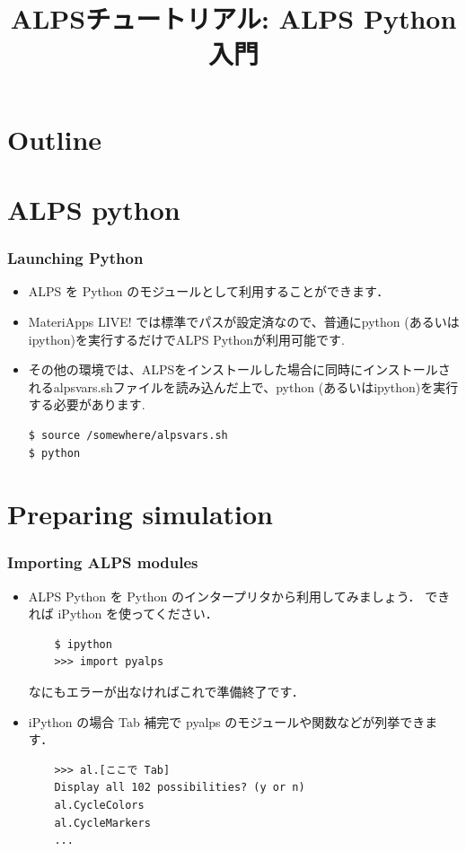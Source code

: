 
\title{ALPSチュートリアル: ALPS Python入門}



\begin{frame}
 \titlepage
\end{frame}

\section*{Outline}
\begin{frame}
 \tableofcontents
\end{frame}

\section{ALPS python}
\begin{frame}[t,fragile]
 \frametitle{Launching Python}
 \begin{itemize}
 \item \alert{ALPS を Python のモジュールとして利用することができます．}

 \item MateriApps LIVE! では標準でパスが設定済なので、普通にpython (あるいはipython)を実行するだけでALPS Pythonが利用可能です.

 \item その他の環境では、ALPSをインストールした場合に同時にインストールされるalpsvars.shファイルを読み込んだ上で、python (あるいはipython)を実行する必要があります.
\begin{lstlisting}
$ source /somewhere/alpsvars.sh
$ python
\end{lstlisting}
\end{itemize}
\end{frame}

\section{Preparing simulation}
\begin{frame}[t,fragile]
 \frametitle{Importing ALPS modules}

\begin{itemize}
 \item ALPS Python を Python のインタープリタから利用してみましょう．
       できれば iPython を使ってください．
       
       \begin{lstlisting}
	$ ipython
	>>> import pyalps
       \end{lstlisting}
       なにもエラーが出なければこれで準備終了です．


 \item iPython の場合 Tab 補完で pyalps のモジュールや関数などが列挙できます．

       \begin{lstlisting}
	>>> al.[ここで Tab]
	Display all 102 possibilities? (y or n)
	al.CycleColors   
	al.CycleMarkers  
	...            
       \end{lstlisting}
\end{itemize}
 
\end{frame}


